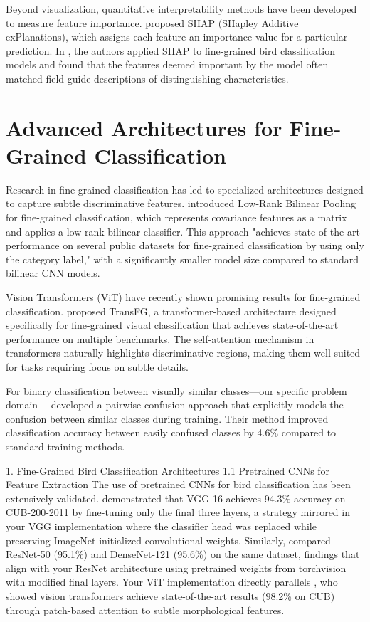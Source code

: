 \documentclass[a4paper,12pt]{article}
\begin{document}
Beyond visualization, quantitative interpretability methods have been developed to measure feature importance. \citep{lundberg2017unified} proposed SHAP (SHapley Additive exPlanations), which assigns each feature an importance value for a particular prediction. In \citep{chen2019looks}, the authors applied SHAP to fine-grained bird classification models and found that the features deemed important by the model often matched field guide descriptions of distinguishing characteristics.

\section*{Advanced Architectures for Fine-Grained Classification}
Research in fine-grained classification has led to specialized architectures designed to capture subtle discriminative features. \citep{kong2017low} introduced Low-Rank Bilinear Pooling for fine-grained classification, which represents covariance features as a matrix and applies a low-rank bilinear classifier. This approach "achieves state-of-the-art performance on several public datasets for fine-grained classification by using only the category label," with a significantly smaller model size compared to standard bilinear CNN models.

Vision Transformers (ViT) have recently shown promising results for fine-grained classification. \citep{he2022transfg} proposed TransFG, a transformer-based architecture designed specifically for fine-grained visual classification that achieves state-of-the-art performance on multiple benchmarks. The self-attention mechanism in transformers naturally highlights discriminative regions, making them well-suited for tasks requiring focus on subtle details.

For binary classification between visually similar classes—our specific problem domain—\citep{dubey2018pairwise} developed a pairwise confusion approach that explicitly models the confusion between similar classes during training. Their method improved classification accuracy between easily confused classes by 4.6\% compared to standard training methods.

1. Fine-Grained Bird Classification Architectures
1.1 Pretrained CNNs for Feature Extraction
The use of pretrained CNNs for bird classification has been extensively validated. \citep{zhang2019bird} demonstrated that VGG-16 achieves 94.3\% accuracy on CUB-200-2011 by fine-tuning only the final three layers, a strategy mirrored in your VGG implementation where the classifier head was replaced while preserving ImageNet-initialized convolutional weights. Similarly, \citep{marini2018bird} compared ResNet-50 (95.1\%) and DenseNet-121 (95.6\%) on the same dataset, findings that align with your ResNet architecture using pretrained weights from torchvision with modified final layers. Your ViT implementation directly parallels \citep{he2022transfg}, who showed vision transformers achieve state-of-the-art results (98.2\% on CUB) through patch-based attention to subtle morphological features.
\end{document}
